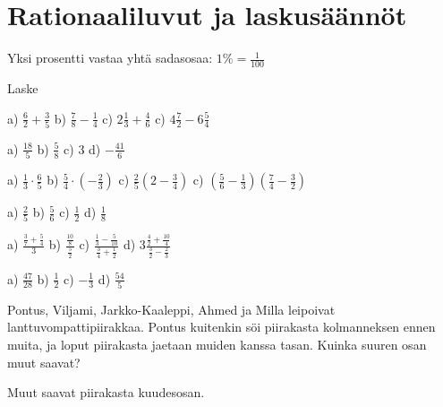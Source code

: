 \chapter{Rationaaliluvut ja laskusäännöt}




Yksi prosentti vastaa yhtä sadasosaa: $1 \% = \frac{1}{100}$

Laske %
\begin{tehtava}
a) $\frac{6}{2} + \frac{3}{5}$
b) $\frac{7}{8} - \frac{1}{4}$
c) $2 \frac{1}{3} + \frac{4}{6}$
c) $4 \frac{7}{2} - 6 \frac{5}{4}$
\begin{vastaus}
a) $\frac{18}{5}$
b) $\frac{5}{8}$
c) $3$
d) $-\frac{41}{6}$
\end{vastaus}
\end{tehtava}

\begin{tehtava}
a) $\frac{1}{3} \cdot \frac{6}{5}$
b) $\frac{5}{4} \cdot (-\frac{2}{3})$
c) $\frac{2}{5} (2 - \frac{3}{4})$
c) $(\frac{5}{6} - \frac{1}{3})(\frac{7}{4} - \frac{3}{2})$
\begin{vastaus}
a) $\frac{2}{5}$
b) $\frac{5}{6}$
c) $\frac{1}{2}$
d) $\frac{1}{8}$
\end{vastaus}
\end{tehtava}

\begin{tehtava} %
a) $ \frac{\frac{3}{7} + \frac{5}{4}}{3}$
b) $ \frac{\frac{10}{8}}{\frac{5}{2}}$
c) $ \frac{\frac{1}{3} - \frac{5}{10}}{\frac{3}{4} + \frac{1}{2}}$
d) $ 3\frac{\frac{4}{2} + \frac{10}{4}}{\frac{3}{2} - \frac{2}{3}}$
\begin{vastaus}
a) $\frac{47}{28}$
b) $\frac{1}{2}$
c) $-\frac{1}{3}$
d) $\frac{54}{5}$
\end{vastaus}
\end{tehtava}

\begin{tehtava} %
Pontus, Viljami, Jarkko-Kaaleppi, Ahmed ja Milla leipoivat lanttuvompattipiirakkaa. Pontus kuitenkin söi piirakasta kolmanneksen ennen muita, ja loput piirakasta jaetaan muiden kanssa tasan. Kuinka suuren osan muut saavat?
\begin{vastaus}
Muut saavat piirakasta kuudesosan.
\end{vastaus}
\end{tehtava}


